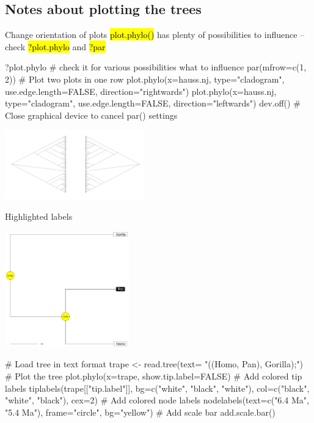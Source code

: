 \documentclass[compress, ucs, xelatex, 11pt, xcolor=svgnames,
  hyperref={
    bookmarks=true,
    unicode=true,
    colorlinks=true,
    pdftitle={Molecular data in R},
    plainpages=false,
    pdfauthor={Vojtech Zeisek},
    pdfsubject={Course about phylogeny and evolution in R},
    pdfcreator={XeLaTeX},
    pdfkeywords={R, evolution, phylogeny, molecular data},
    linkcolor=Tomato,
    anchorcolor=SaddleBrown,
    citecolor=Goldenrod,
    filecolor=DarkMagenta,
    menucolor=Sienna,
    urlcolor=DarkTurquoise,
    pdftex},
  url={hyphens, lowtilde} %
  ]{beamer}
\renewcommand{\texttt}[1]{\hl{\ttfamily #1}}
\begin{document}
\subsection{Notes about plotting the trees}

\begin{frame}[fragile]{Change orientation of plots}
\texttt{plot.phylo()} has plenty of possibilities to influence -- check \texttt{?plot.phylo} and \texttt{?par}
  \begin{spluscode}
    ?plot.phylo # check it for various possibilities what to influence
    par(mfrow=c(1, 2)) # Plot two plots in one row
    plot.phylo(x=hauss.nj, type="cladogram", use.edge.length=FALSE,
      direction="rightwards")
    plot.phylo(x=hauss.nj, type="cladogram", use.edge.length=FALSE,
      direction="leftwards")
    dev.off() # Close graphical device to cancel par() settings
  \end{spluscode}
\begin{center}
  \includegraphics[height=3cm]{lr.png}
\end{center}
\end{frame}

\begin{frame}[fragile]{Highlighted labels}
\begin{multicols}{2}
  \includegraphics[height=5cm]{highlight.png}
  \columnbreak
  \begin{spluscode}
    # Load tree in text format
    trape <- read.tree(text=
      "((Homo, Pan), Gorilla);")
    # Plot the tree
    plot.phylo(x=trape,
      show.tip.label=FALSE)
    # Add colored tip labels
    tiplabels(trape[["tip.label"]],
      bg=c("white", "black",
      "white"), col=c("black",
      "white", "black"), cex=2)
    # Add colored node labels
    nodelabels(text=c("6.4 Ma",
      "5.4 Ma"), frame="circle",
      bg="yellow")
    # Add scale bar
    add.scale.bar()
  \end{spluscode}
\end{multicols}
\end{frame}
\end{document}
